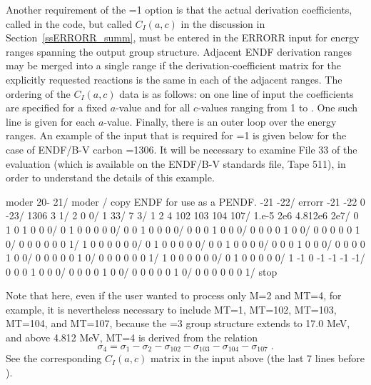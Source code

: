 Another requirement of the =1 option is that the actual
derivation coefficients, called  in the code, but called
$C_I(a,c)$ in the discussion in Section~\ref{ssERRORR_summ}, must be
entered in the
ERRORR input for  energy ranges spanning the output group
structure.  Adjacent ENDF derivation ranges may be merged into a
single range if the derivation-coefficient matrix for the 
explicitly requested reactions is the same in each of the adjacent
ranges.  The ordering of the $C_I(a,c)$ data is as follows: on one line
of input the coefficients are specified for a fixed $a$-value and for
all $c$-values ranging from 1 to .  One such line is given
for each $a$-value.  Finally, there is an outer loop over the
 energy ranges.  An example of the input that is required
for =1 is given below for the case of ENDF/B-V carbon
=1306.  It will be necessary to examine File 33 of the
evaluation (which is available on the ENDF/B-V standards file, Tape
511), in order to understand the details of this example.

\small
\begin{ccode}

   moder
   20- 21/
   moder / copy ENDF for use as a PENDF.
   -21 -22/
   errorr
   -21 -22 0 -23/
   1306 3 1/
   2 0 0/
   1 33/
   7 3/
   1 2 4 102 103 104 107/
   1.e-5 2e6 4.812e6 2e7/
   0 1 0 1 0 0 0/
   0 1 0 0 0 0 0/
   0 0 1 0 0 0 0/
   0 0 0 1 0 0 0/
   0 0 0 0 1 0 0/
   0 0 0 0 0 1 0/
   0 0 0 0 0 0 1/
   1 0 0 0 0 0 0/
   0 1 0 0 0 0 0/
   0 0 1 0 0 0 0/
   0 0 0 1 0 0 0/
   0 0 0 0 1 0 0/
   0 0 0 0 0 1 0/
   0 0 0 0 0 0 1/
   1 0 0 0 0 0 0/
   0 1 0 0 0 0 0/
   1 -1 0 -1 -1 -1 -1/
   0 0 0 1 0 0 0/
   0 0 0 0 1 0 0/
   0 0 0 0 0 1 0/
   0 0 0 0 0 0 1/
   stop

\end{ccode}
\normalsize

Note that here, even if the user wanted to process only M=2 and
MT=4, for example, it is nevertheless necessary to include
MT=1, MT=102, MT=103, MT=104, and MT=107, because the =3
group structure extends to 17.0 MeV, and above 4.812 MeV, MT=4 is
derived from the relation
\begin{equation}
\sigma_4 = \sigma_1 - \sigma_2 - \sigma_{102} - \sigma_{103} -
\sigma_{104} - \sigma_{107} \; .
\end{equation}
See the corresponding $C_I(a,c)$ matrix in the input above (the
last 7 lines before ).

